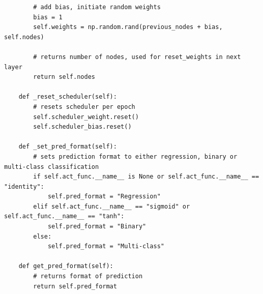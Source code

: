 \documentclass[%
oneside,                 %
final,                   %
10pt]{article}
\begin{document}
\begin{verbatim}
        # add bias, initiate random weights
        bias = 1
        self.weights = np.random.rand(previous_nodes + bias, self.nodes)

        # returns number of nodes, used for reset_weights in next layer
        return self.nodes

    def _reset_scheduler(self):
        # resets scheduler per epoch
        self.scheduler_weight.reset()
        self.scheduler_bias.reset()

    def _set_pred_format(self):
        # sets prediction format to either regression, binary or multi-class classification
        if self.act_func.__name__ is None or self.act_func.__name__ == "identity":
            self.pred_format = "Regression"
        elif self.act_func.__name__ == "sigmoid" or self.act_func.__name__ == "tanh":
            self.pred_format = "Binary"
        else:
            self.pred_format = "Multi-class"

    def get_pred_format(self):
        # returns format of prediction
        return self.pred_format

\end{verbatim}
\end{document}
